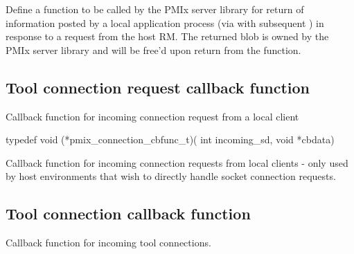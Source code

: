 \begin{arglist}
\end{arglist}


\descr
Define a function to be called by the PMIx server library for return of information posted by a local application process (via  with subsequent ) in response to a request from the host RM. The returned  blob is owned by the PMIx server library and will be free’d upon return from the function.

\subsection{Tool connection request callback function}

\summary

Callback function for incoming connection request from a local client

\format

\cspecificstart
\begin{codepar}
typedef void (*pmix_connection_cbfunc_t)(
                             int incoming_sd, void *cbdata)
\end{codepar}
\cspecificend

\begin{arglist}
\end{arglist}

\descr

Callback function for incoming connection requests from local clients - only used by host environments that wish to directly handle socket connection requests.


\subsection{Tool connection callback function}

\summary

Callback function for incoming tool connections.

